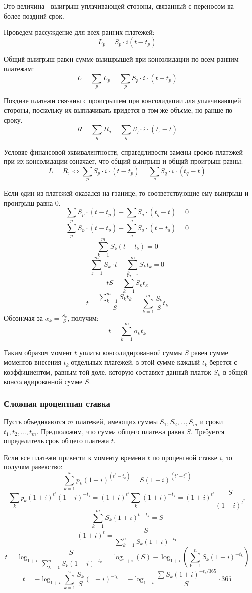 \documentclass[aps,%
12pt,%
final,%
oneside,
onecolumn,%
musixtex, %
superscriptaddress,%
centertags]{article} %
\theoremstyle{plain}
\theoremstyle{definition}
\theoremstyle{remark}
\begin{document}
Это величина - выигрыш уплачивающей стороны, связанный с переносом на более поздний срок.

Проведем рассуждение для всех ранних платежей:
$$L_p = S_p \cdot i (t-t_p)$$

Общий выигрыш равен сумме выишрышей при консолидации по всем ранним платежам:
$$L = \sum\limits_p L_p = \sum\limits_p S_p \cdot i \cdot (t-t_p)$$

Поздние платежи связаны с проигрышем при консолидации для уплачивающей стороны, поскольку их выплачивать придется в том же объеме, но ранше по сроку.
$$R = \sum\limits_q R_q = \sum\limits_q S_q \cdot i \cdot (t_q-t)$$

Условие финансовой эквивалентности, справедливости замены сроков платежей при их консолидации означает, что общий выигрыш и общий проигрыш равны:
$$L=R, \Leftrightarrow  \sum\limits_p S_p \cdot i \cdot (t-t_p) = \sum\limits_q S_q \cdot i \cdot (t_q-t)$$

Если один из платежей оказался на границе, то соответствующие ему выигрыш и проигрыш равна $0$.
$$ \sum\limits_p S_p \cdot (t-t_p) -  \sum\limits_q S_q \cdot (t_q-t) = 0$$
$$ \sum\limits_p S_p \cdot (t-t_p) +  \sum\limits_q S_q \cdot (t-t_q) = 0$$
$$\sum\limits_{k=1}^m S_k(t-t_k) = 0$$
$$\sum\limits_{k=1}^m S_k\cdot t - \sum\limits_{k=1}^m S_k t_k = 0$$
$$tS = \sum\limits_{k=1}^m S_k t_k$$
$$t = \frac{\sum\limits_{k=1}^m S_k t_k}{S} = \sum\limits_{k=1}^m \frac{S_k}{S} t_k$$
Обозначая за $\alpha_k = \frac{S_k}{S}$, получим:
$$t = \sum\limits_{k=1}^m \alpha_k t_k$$

Таким образом момент $t$ уплаты консолидированной суммы $S$ равен сумме моментов внесения $t_k$ отдельных платежей, в этой сумме каждый $t_k$ берется с коэффициентом, равным той доле, которую составяет данный платеж $S_k$ в общей консолидированной сумме $S$.

\subsubsection{Сложная процентная ставка}

Пусть объединяются $m$ платежей, имеющих суммы $S_1,S_2,\ldots,S_m$ и сроки $t_1,t_2,\ldots,t_m$. Предположим, что сумма общего платежа равна $S$. Требуется определитель срок общего платежа $t$.

Если все платежи привести к моменту времени $t$ по процентной ставке $i$, то получим равенство:
$$\sum_{k=1}^{n} p_k (1+i)^{(t^*-t_k)} = S (1+i)^{(t'-t^*)}$$
$$\sum_{k} p_k (1+i)^{t'} (1+i)^{-t_k} = (1+i)^{t'}\sum_{k} (1+i)^{-t_k} = (1+i)^{t'}\frac{S }{(1+i)^{t^*}}$$
$$\sum\limits_{k=1}^m S_k (1+i)^{t-t_k} = S$$
$$(1+i)^{t} = \frac{S}{\sum\limits_{k=1}^{n} S_k (1+i)^{-t_k} }$$
$$t = \log_{1+i} \frac{S}{\sum\limits_{k=1}^{n} S_k (1+i)^{-t_k} } = \log_{1+i} (S) - \log_{1+i} \left(\sum\limits_{k=1}^{n} S_k (1+i)^{-t_k} \right)$$
$$t = - \log_{1+i} \sum\limits_{k=1}^{n} \frac{S_k}{S} (1+i)^{-t_k}  = - \log_{1+i} \frac{\sum S_k (1+i)^{-t_k/365}}{S} \cdot 365$$
\end{document}
